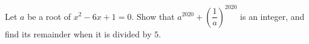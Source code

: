 Let $a$ be a root of $x^2-6x+1=0$. Show that $a^{2020}+\left(\dfrac{1}{a}\right)^{2020}$ is an integer, and find its remainder when it is divided by $5$.
